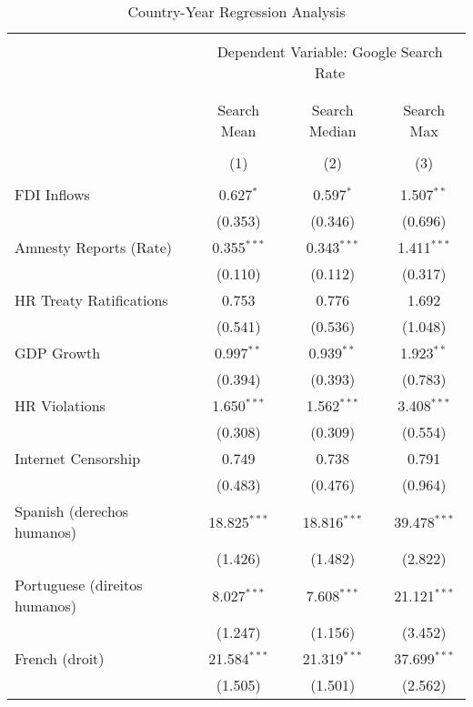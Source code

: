 
\begin{table}[!htbp] \centering 
  \caption{Country-Year Regression Analysis} 
  \label{} 
\begin{tabular}{@{\extracolsep{5pt}}lccc} 
\\[-1.8ex]\hline 
\hline \\[-1.8ex] 
 & \multicolumn{3}{c}{Dependent Variable: Google Search Rate} \\ 
\cline{2-4} 
\\[-1.8ex] & \multicolumn{3}{c}{ } \\ 
 & Search Mean & Search Median & Search Max \\ 
\\[-1.8ex] & (1) & (2) & (3)\\ 
\hline \\[-1.8ex] 
 FDI Inflows & 0.627$^{*}$ & 0.597$^{*}$ & 1.507$^{**}$ \\ 
  & (0.353) & (0.346) & (0.696) \\ 
  Amnesty Reports (Rate) & 0.355$^{***}$ & 0.343$^{***}$ & 1.411$^{***}$ \\ 
  & (0.110) & (0.112) & (0.317) \\ 
  HR Treaty Ratifications & 0.753 & 0.776 & 1.692 \\ 
  & (0.541) & (0.536) & (1.048) \\ 
  GDP Growth & 0.997$^{**}$ & 0.939$^{**}$ & 1.923$^{**}$ \\ 
  & (0.394) & (0.393) & (0.783) \\ 
  HR Violations & 1.650$^{***}$ & 1.562$^{***}$ & 3.408$^{***}$ \\ 
  & (0.308) & (0.309) & (0.554) \\ 
  Internet Censorship & 0.749 & 0.738 & 0.791 \\ 
  & (0.483) & (0.476) & (0.964) \\ 
  Spanish (derechos humanos) & 18.825$^{***}$ & 18.816$^{***}$ & 39.478$^{***}$ \\ 
  & (1.426) & (1.482) & (2.822) \\ 
  Portuguese (direitos humanos) & 8.027$^{***}$ & 7.608$^{***}$ & 21.121$^{***}$ \\ 
  & (1.247) & (1.156) & (3.452) \\ 
  French (droit) & 21.584$^{***}$ & 21.319$^{***}$ & 37.699$^{***}$ \\ 
  & (1.505) & (1.501) & (2.562) \\ 

\end{tabular}
\end{table}
